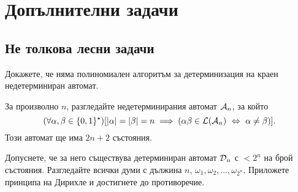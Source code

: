 \section{Допълнителни задачи}




\subsection{Не толкова лесни задачи}

\begin{problem}
  Докажете, че няма полиномиален алгоритъм за детерминизация на краен недетерминиран автомат.
\end{problem}
\begin{hint}
  За произволно $n$, разгледайте недетерминирания автомат $\mathcal{A}_n$, за който
  \[(\forall \alpha,\beta \in \{0,1\}^\star)[|\alpha| = |\beta| = n \implies (\alpha\beta \in \mathcal{L}(\mathcal{A}_n) \ \Leftrightarrow\  \alpha \neq \beta)].\]
  Този автомат ще има $2n+2$ състояния.

  Допуснете, че за него съществува детерминиран автомат $\mathcal{D}_n$ с $< 2^n$ на брой състояния.
  Разгледайте всички думи с дължина $n$, $\omega_1,\omega_2,\dots,\omega_{2^n}$.
  Приложете принципа на Дирихле и достигнете до противоречие.
\end{hint}


